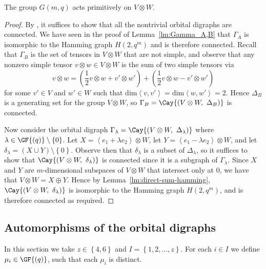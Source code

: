 \begin{prop} \label{prop:primitive}
The group $G{\left(m, q \right)}$ acts primitively on $V \otimes W$.
\end{prop}
\begin{proof}
By \cite[1.12]{ref:higman-intersection}, it suffices to show that all the nontrivial orbital digraphs are connected. We have seen in the proof of Lemma~\ref{lm:Gamma_A,B} that $\Gamma_A$ is isomorphic to the Hamming graph $H{\left(2, q^m \right)}$ and is therefore connected. Recall that $\Gamma_B$ is the set of tensors in $V \otimes W$ that are not simple, and observe that any nonzero simple tensor $v \otimes w \in V \otimes W$ is the sum of two simple tensors via
\begin{displaymath}
v \otimes w = \left(\frac{1}{2} v \otimes w + v' \otimes w' \right) + \left(\frac{1}{2} v \otimes w - v' \otimes w' \right)
\end{displaymath}
for some $v' \in V$ and $w' \in W$ such that $\mathrm{dim} \left<v, v' \right> = \mathrm{dim} \left<w, w' \right> = 2$. Hence $\Delta_B$ is a generating set for the group $V \otimes W$, so $\Gamma_B = \Cay{\left(V \otimes W,\ \Delta_B \right)}$ is connected.

Now consider the orbital digraph $\Gamma_\lambda = \Cay{\left(V \otimes W,\ \Delta_\lambda \right)}$ where $\lambda \in \GF{\left(q \right)} \setminus \left\{0 \right\}$. Let $X = \left<e_1 + \lambda e_2 \right> \otimes W$, let $Y = \left<e_1 - \lambda e_2 \right> \otimes W$, and let $\delta_\lambda = \left(X \cup Y \right) \setminus \left\{0 \right\}$. Observe then that $\delta_\lambda$ is a subset of $\Delta_\lambda$, so it suffices to show that $\Cay{\left(V \otimes W,\ \delta_\lambda \right)}$ is connected since it is a subgraph of $\Gamma_\lambda$. Since $X$ and $Y$ are $m$-dimensional subspaces of $V \otimes W$ that intersect only at $0$, we have that $V \otimes W = X \oplus Y$. Hence by Lemma~\ref{lm:direct-sum-hamming}, $\Cay{\left(V \otimes W,\ \delta_\lambda \right)}$ is isomorphic to the Hamming graph $H{\left(2, q^m \right)}$, and is therefore connected as required.
\end{proof}

\subsection{Automorphisms of the orbital digraphs}
In this section we take $z \in \left\{4, 6 \right\}$ and $I = \left\{1, 2, \ldots, z \right\}$. For each $i \in I$ we define $\mu_i \in \GF{\left(q \right)}$, such that each $\mu_i$ is distinct.

